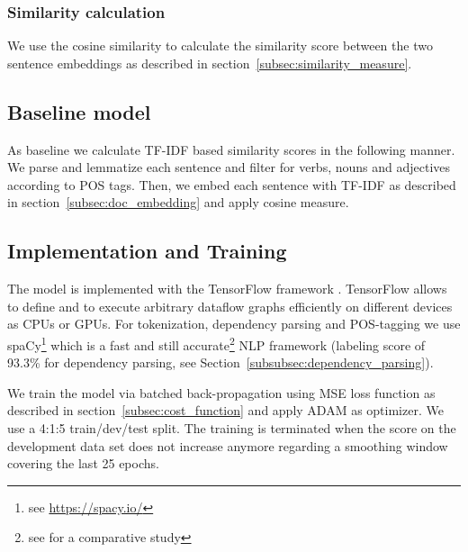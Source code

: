 \subsubsection{Similarity calculation}
We use the cosine similarity to calculate the similarity score between the two sentence embeddings as described in section~\ref{subsec:similarity_measure}.

\subsection{Baseline model}
As baseline we calculate TF-IDF based similarity scores in the following manner. We parse and lemmatize each sentence and filter for verbs, nouns and adjectives according to POS tags. Then, we embed each sentence with TF-IDF as described in section~\ref{subsec:doc_embedding} and apply cosine measure. 

\subsection{Implementation and Training}
\label{subesec:training_implementation}
The model is implemented with the TensorFlow framework  \autocite{abadi_tensorflow_2016}. TensorFlow allows to define and to execute arbitrary dataflow graphs efficiently on different devices as CPUs or GPUs. For tokenization, dependency parsing and POS-tagging we use spaCy\footnote{see \url{https://spacy.io/}} which is a fast and still accurate\footnote{see \textcite{choi_it_2015} for a comparative study} \ac{NLP} framework (labeling score of 93.3\% for dependency parsing, see Section~\ref{subsubsec:dependency_parsing}). 

We train the model via batched back-propagation using \ac{MSE} loss function as described in section~\ref{subsec:cost_function} and apply ADAM \autocite{kingma_adam_2014} %
as optimizer. We use a 4:1:5 train/dev/test split. The training is terminated when the score on the development data set does not increase anymore regarding a smoothing window covering the last 25 epochs.






